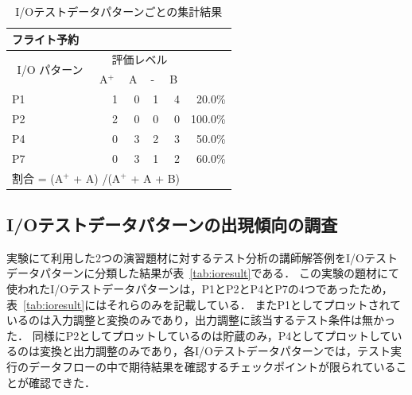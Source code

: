 \begin{table}[htbp]
  \centering
  \caption{I/Oテストデータパターンごとの集計結果}
    \begin{tabular}{lllllr}
    フライト予約 &       &       &       &       &  \bigstrut[b]\\
    \hline
    \multicolumn{1}{|c|}{\multirow{2}[4]{*}{I/O パターン}} & \multicolumn{4}{c|}{評価レベル}    & \multicolumn{1}{c|}{\multirow{2}[4]{*}{}} \bigstrut\\
\cline{2-5}    \multicolumn{1}{|c|}{} & \multicolumn{1}{l|}{A${}^\text{+}$} & \multicolumn{1}{l|}{A} & \multicolumn{1}{l|}{-} & \multicolumn{1}{l|}{B} & \multicolumn{1}{c|}{} \bigstrut\\
    \hline
    \multicolumn{1}{|l|}{P1} & \multicolumn{1}{r|}{1} & \multicolumn{1}{r|}{0} & \multicolumn{1}{r|}{1} & \multicolumn{1}{r|}{4} & \multicolumn{1}{r|}{20.0\%} \bigstrut\\
    \hline
    \multicolumn{1}{|l|}{P2} & \multicolumn{1}{r|}{2} & \multicolumn{1}{r|}{0} & \multicolumn{1}{r|}{0} & \multicolumn{1}{r|}{0} & \multicolumn{1}{r|}{100.0\%} \bigstrut\\
    \hline
    \multicolumn{1}{|l|}{P4} & \multicolumn{1}{r|}{0} & \multicolumn{1}{r|}{3} & \multicolumn{1}{r|}{2} & \multicolumn{1}{r|}{3} & \multicolumn{1}{r|}{50.0\%} \bigstrut\\
    \hline
    \multicolumn{1}{|l|}{P7} & \multicolumn{1}{r|}{0} & \multicolumn{1}{r|}{3} & \multicolumn{1}{r|}{1} & \multicolumn{1}{r|}{2} & \multicolumn{1}{r|}{60.0\%} \bigstrut\\
    \hline
    \multicolumn{5}{l}{割合 = (A${}^\text{+}$  +  A) /(A${}^\text{+}$  +  A + B) } &  \bigstrut[t]\\
    \end{tabular}%
\label{tab:D-4-tab20}%
\end{table}%

\subsection{I/Oテストデータパターンの出現傾向の調査}

実験にて利用した2つの演習題材に対するテスト分析の講師解答例をI/Oテストデータパターンに分類した結果が表~\ref{tab:ioresult}である．
この実験の題材にて使われたI/Oテストデータパターンは，P1とP2とP4とP7の4つであったため，表~\ref{tab:ioresult}にはそれらのみを記載している．
またP1としてプロットされているのは入力調整と変換のみであり，出力調整に該当するテスト条件は無かった．
同様にP2としてプロットしているのは貯蔵のみ，P4としてプロットしているのは変換と出力調整のみであり，各I/Oテストデータパターンでは，テスト実行のデータフローの中で期待結果を確認するチェックポイントが限られていることが確認できた．

